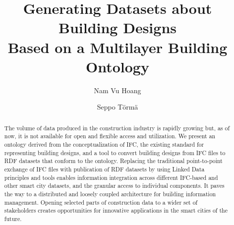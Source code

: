 \documentclass[envcountsame]{llncs}
\begin{document}
%
\frontmatter          %
%
\pagestyle{headings}  %
%


%
\title{Generating Datasets about Building Designs \\Based on a Multilayer Building Ontology}
%
%
\author{Nam Vu Hoang \and Seppo T\"orm\"a}
%
%

\maketitle              %

\begin{abstract}

The volume of data produced in the construction industry is rapidly growing but, as of now, it is not available for open and flexible access and utilization. We present an ontology derived from the conceptualization of IFC, the existing standard for representing building designs, and a tool to convert building designs from IFC files to RDF datasets that conform to the ontology. Replacing the traditional point-to-point exchange of IFC files with publication of RDF datasets  by using Linked Data principles and tools enables information integration across different IFC-based and other smart city datasets, and the granular access to individual components. It paves the way to a distributed and loosely coupled architecture for building information management. Opening selected parts of construction data to a wider set of stakeholders creates opportunities for innovative applications in the smart cities of the future.


\end{abstract}









\clearpage
{} %
\renewcommand{\indexname}{Author Index}
\printindex
\clearpage
{} %
\renewcommand{\indexname}{Subject Index}
% 
\end{document}
